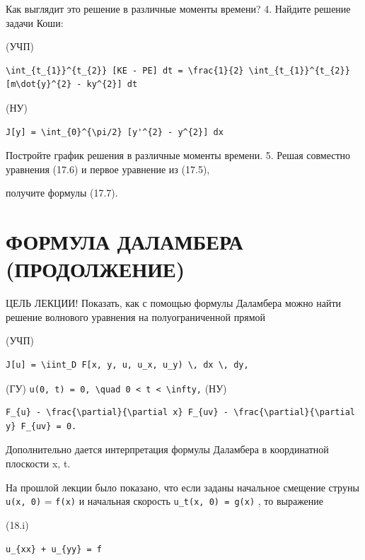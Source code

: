 \documentclass[
  ukrainian,
]{article}
\begin{document}
Как выглядит это решение в различные моменты времени? 4. Найдите решение
задачи Коши:

(УЧП)

\begin{verbatim}
\int_{t_{1}}^{t_{2}} [KE - PE] dt = \frac{1}{2} \int_{t_{1}}^{t_{2}} [m\dot{y}^{2} - ky^{2}] dt
\end{verbatim}

(НУ)

\begin{verbatim}
J[y] = \int_{0}^{\pi/2} [y'^{2} - y^{2}] dx
\end{verbatim}

Постройте график решения в различные моменты времени. 5. Решая совместно
уравнения (17.6) и первое уравнение из (17.5),

получите формулы (17.7).

\section{ФОРМУЛА ДАЛАМБЕРА
(ПРОДОЛЖЕНИЕ)}\label{ux444ux43eux440ux43cux443ux43bux430-ux434ux430ux43bux430ux43cux431ux435ux440ux430-ux43fux440ux43eux434ux43eux43bux436ux435ux43dux438ux435}

ЦЕЛЬ ЛЕКЦИИ! Показать, как с помощью формулы Даламбера можно найти
решение волнового уравнения на полуограниченной прямой

(УЧП)

\begin{verbatim}
J[u] = \iint_D F[x, y, u, u_x, u_y) \, dx \, dy,
\end{verbatim}

(ГУ)
\texttt{u(0,\ t)\ =\ 0,\ \textbackslash{}quad\ 0\ \textless{}\ t\ \textless{}\ \textbackslash{}infty,}
(НУ)

\begin{verbatim}
F_{u} - \frac{\partial}{\partial x} F_{uv} - \frac{\partial}{\partial y} F_{uv} = 0.
\end{verbatim}

Дополнительно дается интерпретация формулы Даламбера в координатной
плоскости x, t.

На прошлой лекции было показано, что если заданы начальное смещение
струны \texttt{u(x,\ 0)} = \texttt{f(x)} и начальная скорость
\texttt{u\_t(x,\ 0)\ =\ g(x)} , то выражение

(18.i)

\begin{verbatim}
u_{xx} + u_{yy} = f
\end{verbatim}
\end{document}
